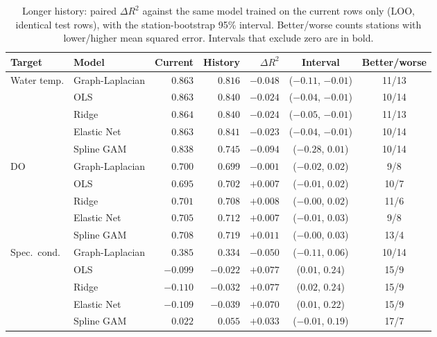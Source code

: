 \documentclass[11pt]{article}
\begin{document}
\begin{table}[h]
\centering
\small
\caption{Longer history: paired $\Delta R^2$ against the same model trained on the current rows only
(LOO, identical test rows), with the station-bootstrap 95\% interval. Better/worse counts stations
with lower/higher mean squared error. Intervals that exclude zero are in bold.}
\label{tab:history}
\begin{tabular}{ll rrrcc}
\toprule
Target & Model & Current & History & $\Delta R^2$ & Interval & Better/worse \\
\midrule
Water temp.   & Graph-Laplacian & $0.863$ & $0.816$ & $\mathbf{-0.048}$ & ($-0.11$, $-0.01$) & 11/13 \\
              & OLS             & $0.863$ & $0.840$ & $\mathbf{-0.024}$ & ($-0.04$, $-0.01$) & 10/14 \\
              & Ridge           & $0.864$ & $0.840$ & $\mathbf{-0.024}$ & ($-0.05$, $-0.01$) & 11/13 \\
              & Elastic Net     & $0.863$ & $0.841$ & $\mathbf{-0.023}$ & ($-0.04$, $-0.01$) & 10/14 \\
              & Spline GAM      & $0.838$ & $0.745$ & $-0.094$ & ($-0.28$, $0.01$) & 10/14 \\
\addlinespace
DO            & Graph-Laplacian & $0.700$ & $0.699$ & $-0.001$ & ($-0.02$, $0.02$) & 9/8 \\
              & OLS             & $0.695$ & $0.702$ & $+0.007$ & ($-0.01$, $0.02$) & 10/7 \\
              & Ridge           & $0.701$ & $0.708$ & $+0.008$ & ($-0.00$, $0.02$) & 11/6 \\
              & Elastic Net     & $0.705$ & $0.712$ & $+0.007$ & ($-0.01$, $0.03$) & 9/8 \\
              & Spline GAM      & $0.708$ & $0.719$ & $+0.011$ & ($-0.00$, $0.03$) & 13/4 \\
\addlinespace
Spec.\ cond.  & Graph-Laplacian & $0.385$ & $0.334$ & $-0.050$ & ($-0.11$, $0.06$) & 10/14 \\
              & OLS             & $-0.099$ & $-0.022$ & $\mathbf{+0.077}$ & ($0.01$, $0.24$) & 15/9 \\
              & Ridge           & $-0.110$ & $-0.032$ & $\mathbf{+0.077}$ & ($0.02$, $0.24$) & 15/9 \\
              & Elastic Net     & $-0.109$ & $-0.039$ & $\mathbf{+0.070}$ & ($0.01$, $0.22$) & 15/9 \\
              & Spline GAM      & $0.022$ & $0.055$ & $+0.033$ & ($-0.01$, $0.19$) & 17/7 \\

\end{tabular}
\end{table}
\end{document}
